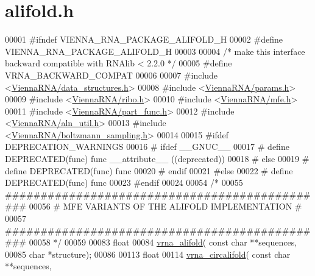\hypertarget{alifold_8h_source}{}\section{alifold.\+h}
\label{alifold_8h_source}

\begin{DoxyCode}
00001 \textcolor{preprocessor}{#ifndef VIENNA\_RNA\_PACKAGE\_ALIFOLD\_H}
00002 \textcolor{preprocessor}{#define VIENNA\_RNA\_PACKAGE\_ALIFOLD\_H}
00003 
00004 \textcolor{comment}{/* make this interface backward compatible with RNAlib < 2.2.0 */}
00005 \textcolor{preprocessor}{#define VRNA\_BACKWARD\_COMPAT}
00006 
00007 \textcolor{preprocessor}{#include <\hyperlink{data__structures_8h}{ViennaRNA/data\_structures.h}>}
00008 \textcolor{preprocessor}{#include <\hyperlink{params_8h}{ViennaRNA/params.h}>}
00009 \textcolor{preprocessor}{#include <\hyperlink{ribo_8h}{ViennaRNA/ribo.h}>}
00010 \textcolor{preprocessor}{#include <\hyperlink{mfe_8h}{ViennaRNA/mfe.h}>}
00011 \textcolor{preprocessor}{#include <\hyperlink{part__func_8h}{ViennaRNA/part\_func.h}>}
00012 \textcolor{preprocessor}{#include <\hyperlink{aln__util_8h}{ViennaRNA/aln\_util.h}>}
00013 \textcolor{preprocessor}{#include <\hyperlink{boltzmann__sampling_8h}{ViennaRNA/boltzmann\_sampling.h}>}
00014 
00015 \textcolor{preprocessor}{#ifdef DEPRECATION\_WARNINGS}
00016 \textcolor{preprocessor}{# ifdef \_\_GNUC\_\_}
00017 \textcolor{preprocessor}{#  define DEPRECATED(func) func \_\_attribute\_\_ ((deprecated))}
00018 \textcolor{preprocessor}{# else}
00019 \textcolor{preprocessor}{#  define DEPRECATED(func) func}
00020 \textcolor{preprocessor}{# endif}
00021 \textcolor{preprocessor}{#else}
00022 \textcolor{preprocessor}{# define DEPRECATED(func) func}
00023 \textcolor{preprocessor}{#endif}
00024 
00054 \textcolor{comment}{/*}
00055 \textcolor{comment}{##############################################}
00056 \textcolor{comment}{# MFE VARIANTS OF THE ALIFOLD IMPLEMENTATION #}
00057 \textcolor{comment}{##############################################}
00058 \textcolor{comment}{*/}
00059 
00083 \textcolor{keywordtype}{float}
00084 \hyperlink{group__consensus__mfe__fold_ga6c9d3bef3e92c6d423ffac9f981418c1}{vrna\_alifold}( \textcolor{keyword}{const} \textcolor{keywordtype}{char} **sequences,
00085               \textcolor{keywordtype}{char} *structure);
00086 
00113 \textcolor{keywordtype}{float}
00114 \hyperlink{group__consensus__mfe__fold_ga17a1be7490468c29c335ba9bffacba53}{vrna\_circalifold}( \textcolor{keyword}{const} \textcolor{keywordtype}{char} **sequences,

\end{DoxyCode}
